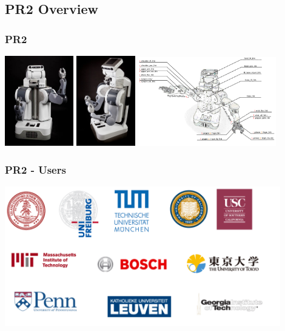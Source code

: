 \subsection{PR2 Overview}
\begin{frame}
  \frametitle{PR2}
\hspace{-3ex}\includegraphics[width=3cm]{img/PR2_front.jpeg} 
\includegraphics[width=2.57cm]{img/PR2_side.jpeg} 
\includegraphics[width=6cm]{img/pr2_link_name.png}
\end{frame}

\begin{frame}
  \frametitle{PR2 - Users}
\centering\includegraphics[width=12cm]{img/pr2_users.pdf} 
\end{frame}


